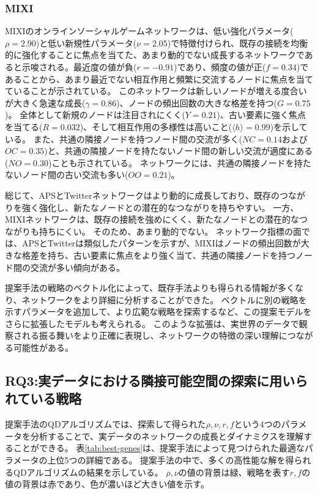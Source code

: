 \documentclass[uplatex,11pt,openany]{ujreport}
\begin{document}
            \subsubsection*{MIXI}
            MIXIのオンラインソーシャルゲームネットワークは、低い強化パラメータ($\rho = 2.90$)と低い新規性パラメータ($\nu = 2.05$)で特徴付けられ、既存の接続を均衡的に強化することに焦点を当てた、あまり動的でない成長するネットワークであると示唆される。最近度の値が負($r = -0.91$)であり、頻度の値が正($f = 0.34$)であることから、あまり最近でない相互作用と頻繁に交流するノードに焦点を当てていることが示されている。
            このネットワークは新しいノードが増える度合いが大きく急速な成長($\gamma = 0.86$)、ノードの頻出回数の大きな格差を持つ($G = 0.75$)。
            全体として新規のノードは注目されにくく($Y = 0.21$)、古い要素に強く焦点を当てる($R = 0.032$)、そして相互作用の多様性は高いこと($\langle h \rangle = 0.99$)を示している。
            また、共通の隣接ノードを持つノード間の交流が多く($NC = 0.14$および$OC = 0.35$)と、共通の隣接ノードを持たないノード間の新しい交流が適度にある($NO = 0.30$)ことも示されている。
            ネットワークには、共通の隣接ノードを持たないノード間の古い交流も多い($OO = 0.21$)。

            総じて、APSとTwitterネットワークはより動的に成長しており、既存のつながりを強く強化し、新たなノードとの潜在的なつながりを持ちやすい。
            一方、MIXIネットワークは、既存の接続を強めにくく、新たなノードとの潜在的なつながりも持ちにくい。
            そのため、あまり動的でない。
            ネットワーク指標の面では、APSとTwitterは類似したパターンを示すが、MIXIはノードの頻出回数が大きな格差を持ち、古い要素に焦点をより強く当て、共通の隣接ノードを持つノード間の交流が多い傾向がある。

            提案手法の戦略のベクトル化によって、既存手法よりも得られる情報が多くなり、ネットワークをより詳細に分析することができた。
            ベクトルに別の戦略を示すパラメータを追加して、より広範な戦略を探索するなど、この提案モデルをさらに拡張したモデルも考えられる。
            このような拡張は、実世界のデータで観察される振る舞いをより正確に表現し、ネットワークの特徴の深い理解につながる可能性がある。


        \subsection{RQ3:実データにおける隣接可能空間の探索に用いられている戦略}
            提案手法のQDアルゴリズムでは、探索して得られた$\rho, \nu, r, f$という4つのパラメータを分析することで、実データのネットワークの成長とダイナミクスを理解することができる。
            表\ref{tab:best-genes}は、提案手法によって見つけられた最適なパラメータの上位5つの詳細である。
            提案手法の中で、多くの高性能な解を得られるQDアルゴリズムの結果を示している。
            $\rho, \nu$の値の背景は緑、戦略を表す$r, f$の値の背景は赤であり、色が濃いほど大きい値を示す。
\end{document}
